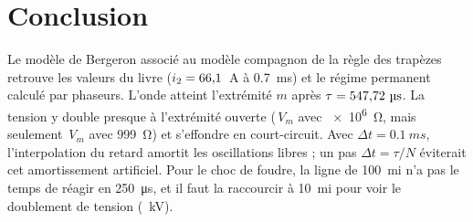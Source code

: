 \section{Conclusion}

Le modèle de Bergeron associé au modèle compagnon de la règle des trapèzes retrouve les valeurs
du livre ($i_2 = 66{,}1$~A à \SI{0.7}{ms}) et le régime permanent calculé par phaseurs. L'onde
atteint l'extrémité $m$ après $\tau = \tauL~\unit{\micro s}$. La tension y double presque à
l'extrémité ouverte (\rapMega{}\,$V_m$ avec \SI{e6}{\ohm}, mais seulement \rapNeuf{}\,$V_m$ avec
999~\unit{\ohm}) et s'effondre en court-circuit. Avec $\Delta t = \SI{0.1}{ms}$, l'interpolation
du retard amortit les oscillations libres ; un pas $\Delta t = \tau/N$ éviterait cet
amortissement artificiel. Pour le choc de foudre, la ligne de 100~mi n'a pas le temps de réagir
en \SI{250}{\micro s}, et il faut la raccourcir à 10~mi pour voir le doublement de tension
(\gVRL~kV).
